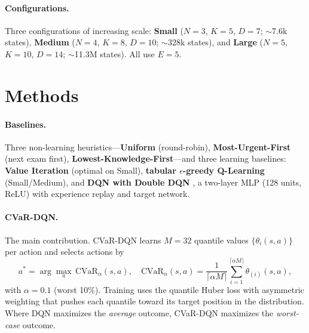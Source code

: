 \documentclass[a4paper,11pt]{article}
\theoremstyle{definition}
\begin{document}
\paragraph{Configurations.} Three configurations of increasing scale: \textbf{Small} ($N{=}3$, $K{=}5$, $D{=}7$; $\sim$7.6k states), \textbf{Medium} ($N{=}4$, $K{=}8$, $D{=}10$; $\sim$328k states), and \textbf{Large} ($N{=}5$, $K{=}10$, $D{=}14$; $\sim$11.3M states). All use $E = 5$.

\section{Methods}
\label{sec:methods}

\paragraph{Baselines.} Three non-learning heuristics---\textbf{Uniform} (round-robin), \textbf{Most-Urgent-First} (next exam first), \textbf{Lowest-Knowledge-First}---and three learning baselines: \textbf{Value Iteration} (optimal on Small), \textbf{tabular $\epsilon$-greedy Q-Learning} (Small/Medium), and \textbf{DQN with Double DQN} \citep{mnih2015,vanhasselt2016}, a two-layer MLP (128 units, ReLU) with experience replay and target network.

\paragraph{CVaR-DQN.} The main contribution. CVaR-DQN \citep{dabney2018} learns $M = 32$ quantile values $\{\theta_i(s, a)\}$ per action and selects actions by
\begin{equation}
    a^* = \arg\max_a \, \text{CVaR}_\alpha(s, a), \quad
    \text{CVaR}_\alpha(s, a) = \frac{1}{\lceil \alpha M \rceil} \sum_{i=1}^{\lceil \alpha M \rceil} \theta_{(i)}(s, a),
    \label{eq:cvar}
\end{equation}
with $\alpha = 0.1$ (worst 10\%). Training uses the quantile Huber loss \citep{dabney2018} with asymmetric weighting that pushes each quantile toward its target position in the distribution. Where DQN maximizes the \emph{average} outcome, CVaR-DQN maximizes the \emph{worst-case} outcome.
\end{document}
